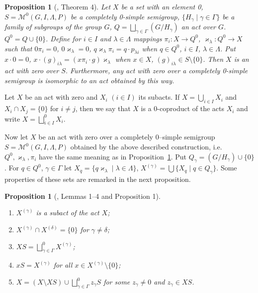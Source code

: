 \documentclass{birkau}
\numberwithin{equation}{section}
\theoremstyle{plain}
\newtheorem{proposition}[theorem]{Proposition}
\theoremstyle{definition}
\begin{document}
	\begin{proposition}[\cite{avdeev}, Theorem 4] \label{pr02}
	    Let $X$ be a set with an element 0, $S=\mathcal{M}^0(G,I,\Lambda,P)$ be a completely 0-simple semigroup, $\{ H_\gamma \mid \gamma \in \Gamma \}$ be a family of subgroups of the group $G$, $ Q = \bigsqcup_{\gamma \in \Gamma} (G/H_\gamma) $ an act over $G$. $Q^0 = Q \cup \{0\}$. Define for $i \in I$ and $\lambda \in \Lambda$ mappings $\pi_i:X \rightarrow Q^0$, $\varkappa_\lambda: Q^0 \rightarrow X$ such that $0\pi_i = 0$, $0\varkappa_\lambda = 0$, $q \varkappa_\lambda \pi_i = q \cdot p_{\lambda i}$ when $ q \in Q^0$, $i \in I$, $\lambda \in \Lambda$. Put $x \cdot 0 = 0$, $x \cdot (g)_{i \lambda} = (x \pi_i \cdot g)\varkappa_{\lambda}$ when $x \in X$, $(g)_{i \lambda} \in S \setminus \{0\}$. Then $X$ is an act with zero over $S$. Furthermore, any act with zero over a completely 0-simple semigroup is isomorphic to an act obtained by this way.
	\end{proposition}
	
	Let $X$ be an act with zero and $X_i$ $(i \in I)$ its subacts. If $X = \bigcup_{i \in I} X_i$ and $X_i \cap X_j = \{0\}$ for $i \neq j$, then we say that $X$ is a 0-coproduct of the acts $X_i$ and write $X = \bigsqcup_{i \in I}^0 X_i$.
	
	Now let $X$ be an act with zero over a completely 0--simple semigroup $S=\mathcal{M}^0(G,I,\Lambda,P)$ obtained by the above described construction, i.e. $Q^0,\varkappa_\lambda,\pi_i$ have the same meaning as in Proposition~\ref{pr02}. Put $Q_\gamma = (G/H_\gamma) \cup \{0\}$. For $q \in Q^0$, $\gamma \in \Gamma$ let $X_q = \{q\varkappa_\lambda \mid \lambda \in \Lambda \}$, $X^{(\gamma)} = \bigcup\{X_q \mid q \in Q_{\gamma}\}$. Some properties of these sets are remarked in the next proposition.
	
	\begin{proposition}[\cite{avdeev}, Lemmas 1--4 and Proposition 1] \label{pr03}
		\
		\begin{enumerate}
			\item[(1)] $X^{(\gamma)}$ is a subact of the act $X$;
			\item[(2)] $X^{(\gamma)} \cap X^{(\delta)} = \{0\}$ for $\gamma \neq \delta$;
			\item[(3)] $XS = \bigsqcup_{\gamma \in \Gamma}^0 X^{(\gamma)}$;
			\item[(4)] $xS = X^{(\gamma)}$ for all $x \in X^{(\gamma)} \setminus \{0\}$;
			\item[(5)] $X = (X \setminus XS) \cup \bigsqcup_{\gamma \in \Gamma}^0 z_{\gamma} S $ for some $z_\gamma \neq 0$ and $z_\gamma \in XS$.
		\end{enumerate}
	\end{proposition}
	
\end{document}
